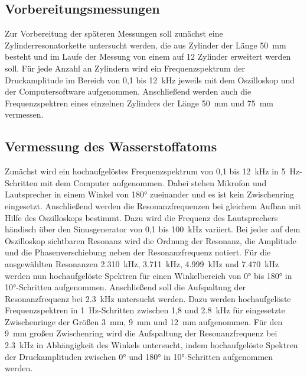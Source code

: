             \FloatBarrier

            \noindent


    \subsection{Vorbereitungsmessungen}
        Zur Vorbereitung der späteren Messungen soll zunächst eine Zylinderresonatorkette untersucht werden, die aus Zylinder der Länge \SI{50}{\milli\metre} besteht und im Laufe der Messung von einem auf 12
        Zylinder erweitert werden soll. Für jede Anzahl an Zylindern wird ein Frequenzspektrum der Druckamplitude im Bereich von 0,1 bis \SI{12}{\kilo\hertz} jeweils mit dem Oszilloskop und der 
        Computersoftware aufgenommen. Anschließend werden auch die Frequenzspektren eines einzelnen Zylinders der Länge \SI{50}{\milli\metre} und \SI{75}{\milli\metre} vermessen.

    \subsection{Vermessung des Wasserstoffatoms}
        Zunächst wird ein hochaufgelöstes Frequenzspektrum von 0,1 bis \SI{12}{\kilo\hertz} in \SI{5}{\hertz}-Schritten mit dem Computer aufgenommen. Dabei stehen Mikrofon und Lautsprecher in einem Winkel von 
        180° zueinander und es ist kein Zwischenring eingesetzt.\newline
        Anschließend werden die Resonanzfrequenzen bei gleichem Aufbau mit Hilfe des Oszilloskops bestimmt. Dazu wird die Frequenz des Lautsprechers händisch über den Sinusgenerator von 0,1 bis 
        \SI{100}{\kilo\hertz} variiert. Bei jeder auf dem Oszilloskop sichtbaren Resonanz wird die Ordnung der Resonanz, die Amplitude und die Phasenverschiebung neben der Resonanzfrequenz notiert.\newline
        Für die ausgewählten Resonanzen \SI{2.310}{\kilo\hertz}, \SI{3.711}{\kilo\hertz}, \SI{4.999}{\kilo\hertz} und \SI{7.470}{\kilo\hertz} werden nun hochaufgelöste Spektren für einen Winkelbereich von 
        0° bis 180° in 10°-Schritten aufgenommen.\newline
        Anschließend soll die Aufspaltung der Resonanzfrequenz bei \SI{2.3}{\kilo\hertz} untersucht werden. Dazu werden hochaufgelöste Frequenzspektren in \SI{1}{\hertz}-Schritten zwischen 1,8 und 
        \SI{2.8}{\kilo\hertz} für eingesetzte Zwischenringe der Größen \SI{3}{\milli\metre}, \SI{9}{\milli\metre} und \SI{12}{\milli\metre} aufgenommen.\newline
        Für den \SI{9}{\milli\metre} großen Zwischenring wird die Aufspaltung der Resonanzfrequenz bei \SI{2.3}{\kilo\hertz} in Abhängigkeit des Winkels untersucht, indem hochaufgelöste Spektren der 
        Druckamplituden zwischen 0° und 180° in 10°-Schritten aufgenommen werden.

